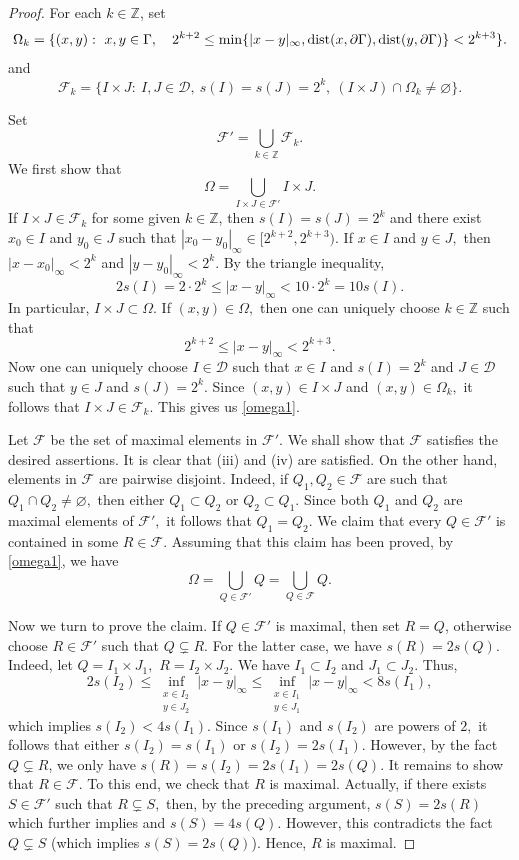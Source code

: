 \documentclass{amsart}
\begin{document}
\begin{proof} For each $k\in\mathbb{Z}$, set
$$\Omega_k=\{(x,y):\ x,y\in\Gamma,\quad 2^{k+2}\leq \min\{|x-y|_{\infty},{\rm dist}(x,\partial\Gamma),{\rm dist}(y,\partial\Gamma)\}<2^{k+3}\}.$$ 
	and
	$$\mathcal{F}_k=\{I\times J:\ I,J\in\mathcal{D},\ s(I)=s(J)=2^k,\  (I\times J)\cap\Omega_k\neq\varnothing\}.$$
	
	
	Set 
	$$\mathcal{F}'=\bigcup_{k\in\mathbb{Z}}\mathcal{F}_k.$$
	We first show that 
	\begin{equation}\label{omega1}
		\Omega=\bigcup_{I\times J\in\mathcal{F}'}I\times J.
	\end{equation}
	If $I\times J\in\mathcal{F}_k$ for some given $k\in\mathbb{Z}$, then $s(I)=s(J)=2^k$ and there exist $x_0\in I$ and $y_0\in J$ such that $|x_0-y_0|_{\infty}\in[2^{k+2},2^{k+3}).$ If $x\in I$ and $y\in J,$ then $|x-x_0|_{\infty}<2^k$ and $|y-y_0|_{\infty}<2^k.$ By the triangle inequality,
	$$2s(I)=2\cdot 2^k\leq |x-y|_{\infty}<10\cdot 2^k=10s(I).$$
	In particular, $I\times J\subset\Omega.$
	If $(x,y)\in\Omega,$ then one can uniquely choose $k\in\mathbb{Z}$ such that
	$$2^{k+2}\leq |x-y|_{\infty}<2^{k+3}.$$
	Now one can uniquely choose $I\in\mathcal{D}$ such that $x\in I$ and $s(I)=2^k$ and $J\in\mathcal{D}$ such that $y\in J$ and $s(J)=2^{k}.$ Since $(x,y)\in I\times J$ and $(x,y)\in\Omega_k,$ it follows that $I\times J\in\mathcal{F}_k.$ This gives us \eqref{omega1}.
	
	
	Let $\mathcal{F}$ be the set of maximal elements in $\mathcal{F}'.$ We shall show that $\mathcal{F}$ satisfies the desired assertions.    It is clear that (iii) and (iv) are satisfied. On the other hand,  elements in $\mathcal{F}$ are pairwise disjoint. Indeed, if $Q_1,Q_2\in\mathcal{F}$ are such that $Q_1\cap Q_2\neq\varnothing,$ then either $Q_1\subset Q_2$ or $Q_2\subset Q_1.$ Since both $Q_1$ and $Q_2$ are maximal elements of $\mathcal{F}',$ it follows that $Q_1=Q_2.$ 
	We claim that every $Q\in\mathcal{F}'$ is contained in some $R\in\mathcal{F}.$ Assuming that this claim has been proved,  by \eqref{omega1}, we have
	$$\Omega=\bigcup_{Q\in\mathcal{F}'}Q=\bigcup_{Q\in\mathcal{F}}Q.$$
	
	
	Now we turn to prove the claim.  If $Q\in\mathcal{F}'$ is maximal, then set $R=Q$, otherwise
	choose $R\in\mathcal{F}'$ such that $Q\subsetneq R$.
	For the latter case, we have $s(R)=2s(Q)$. Indeed, let $Q=I_1\times J_1,$ $R=I_2\times J_2.$ We have $I_1\subset I_2$ and $J_1\subset J_2.$ Thus,
	$$2s(I_2)\leq \inf_{\substack{x\in I_2\\ y\in J_2}}|x-y|_{\infty}\leq\inf_{\substack{x\in I_1\\ y\in J_1}}|x-y|_{\infty}<8s(I_1),$$
	which implies $s(I_2)<4s(I_1).$ Since $s(I_1)$ and $s(I_2)$ are powers of $2,$ it follows that either $s(I_2)=s(I_1)$ or $s(I_2)=2s(I_1).$ However, by the fact $Q\subsetneq R$,  we only have  $s(R)=s(I_2)=2s(I_1)=2s(Q).$
	It remains to show that $R\in\mathcal{F}$. To this end, we check that
	$R$ is maximal. Actually, if there exists $S\in\mathcal{F}'$ such that $R\subsetneq S,$ then, by the preceding argument, $s(S)=2s(R)$ which further implies and $s(S)=4s(Q). $  However, this contradicts the fact $Q\subsetneq S$ (which implies $s(S)=2s(Q)$). Hence, $R$ is maximal.
	

\end{proof}
\end{document}
